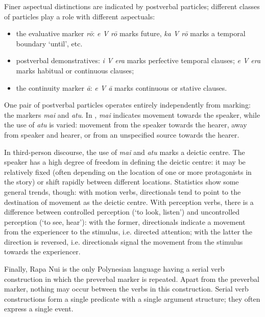 Finer aspectual distinctions are indicated by postverbal particles; different classes of particles play a role with different aspectuals:

\begin{itemize}
\item 
the evaluative marker \textit{rō}: \textit{e V rō} marks future, \textit{ka V rō} marks a temporal boundary ‘until’, etc.

\item 
postverbal demonstratives: \textit{i V era} marks perfective temporal clauses; \textit{e V era} marks habitual or continuous clauses;

\item 
the continuity marker \textit{{\ꞌ}ā}: \textit{e V {\ꞌ}ā} marks continuous or stative clauses.

\end{itemize}

One pair of postverbal particles operates entirely independently from  marking: the  markers \textit{mai} and \textit{atu}. In , \textit{mai} indicates movement towards the speaker, while the use of \textit{atu} is varied: movement from the speaker towards the hearer, away from speaker and hearer, or from an unspecified source towards the hearer. 

In third-person discourse, the use of \textit{mai} and \textit{atu} marks a deictic centre. The speaker has a high degree of freedom in defining the deictic centre: it may be relatively fixed (often depending on the location of one or more protagonists in the story) or shift rapidly between different locations. Statistics show some general trends, though: with motion verbs, directionals tend to point to the destination of movement as the deictic centre. With perception verbs, there is a difference between controlled perception (‘to look, listen’) and uncontrolled perception (‘to see, hear’): with the former, directionals indicate a movement from the experiencer to the stimulus, i.e. directed attention; with the latter the direction is reversed, i.e. directionals signal the movement from the stimulus towards the experiencer.

\largerpage[2]
Finally, Rapa Nui is the only Polynesian language having a serial verb construction in which the preverbal marker is repeated. Apart from the preverbal marker, nothing may occur between the verbs in this construction. Serial verb constructions form a single predicate with a single argument structure; they often express a single event.
